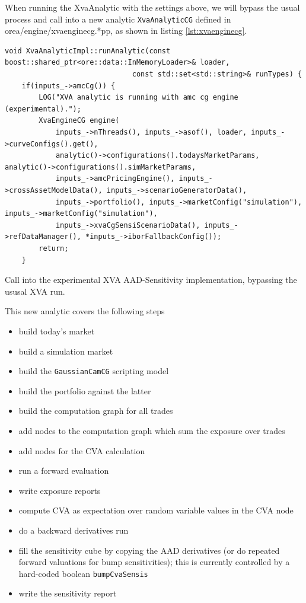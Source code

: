 \documentclass[12pt, a4paper]{report}
\begin{document}
When running the XvaAnalytic with the settings above, we will bypass the usual process
and call into a new analytic {\tt XvaAnalyticCG} defined in orea/engine/xvaenginecg.*pp,
as shown in listing \ref{lst:xvaenginecg}.

\begin{listing}[hbt]
\begin{verbatim}
void XvaAnalyticImpl::runAnalytic(const boost::shared_ptr<ore::data::InMemoryLoader>& loader,
                              const std::set<std::string>& runTypes) {
    if(inputs_->amcCg()) {
        LOG("XVA analytic is running with amc cg engine (experimental).");
        XvaEngineCG engine(
            inputs_->nThreads(), inputs_->asof(), loader, inputs_->curveConfigs().get(),
            analytic()->configurations().todaysMarketParams, analytic()->configurations().simMarketParams,
            inputs_->amcPricingEngine(), inputs_->crossAssetModelData(), inputs_->scenarioGeneratorData(),
            inputs_->portfolio(), inputs_->marketConfig("simulation"), inputs_->marketConfig("simulation"),
            inputs_->xvaCgSensiScenarioData(), inputs_->refDataManager(), *inputs_->iborFallbackConfig());
        return;
    }
\end{verbatim}
\caption{Call into the experimental XVA AAD-Sensitivity implementation, bypassing the ususal XVA run.}
\label{lst:xvaenginecg}
\end{listing}

This new analytic covers the following steps
\begin{itemize}
\item build today's market
\item build a simulation market
\item build the {\tt GaussianCamCG} scripting model
\item build the portfolio against the latter
\item build the computation graph for all trades
\item add nodes to the computation graph which sum the exposure over trades
\item add nodes for the CVA calculation
\item run a forward evaluation
\item write exposure reports
\item compute CVA as expectation over random variable values in the CVA node
\item do a backward derivatives run
\item fill the sensitivity cube by copying the AAD derivatives (or do repeated forward valuations for bump sensitivities);
  this is currently controlled by a hard-coded boolean {\tt bumpCvaSensis}
\item write the sensitivity report
\end{itemize}
\end{document}
